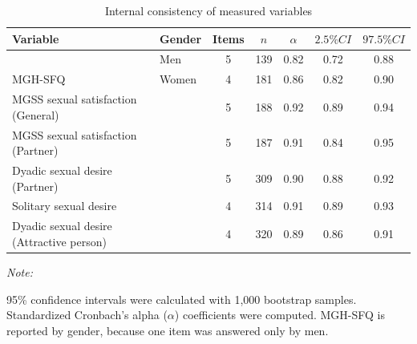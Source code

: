 \documentclass[
  bookmarksnumbered]{article}
\newenvironment{Shaded}{\begin{snugshade}}{\end{snugshade}}
\newcommand{\AttributeTok}[1]{\textcolor[rgb]{0.80,0.80,0.80}{#1}}
\newcommand{\ConstantTok}[1]{\textcolor[rgb]{0.86,0.64,0.64}{\textbf{#1}}}
\newcommand{\FunctionTok}[1]{\textcolor[rgb]{0.94,0.94,0.56}{#1}}
\newcommand{\NormalTok}[1]{\textcolor[rgb]{0.80,0.80,0.80}{#1}}
\newcommand{\SpecialCharTok}[1]{\textcolor[rgb]{0.86,0.64,0.64}{#1}}
\newcommand{\StringTok}[1]{\textcolor[rgb]{0.80,0.58,0.58}{#1}}
\begin{document}
\begin{Shaded}
\end{Shaded}

\begin{table}[H]
\centering
\caption{\label{tab:Cronbach-tab}Internal consistency of measured variables}
\centering
\begin{threeparttable}
\begin{tabular}[t]{llccccc}
\toprule
Variable & Gender & Items & $n$ & $\alpha$ & $2.5\% CI$ & $97.5\% CI$\\
\midrule
 & Men & 5 & 139 & 0.82 & 0.72 & 0.88\\
\cmidrule{2-7}
\multirow{-2}{*}{\raggedright\arraybackslash MGH-SFQ} & Women & 4 & 181 & 0.86 & 0.82 & 0.90\\
\cmidrule{1-7}
MGSS sexual satisfaction (General) &  & 5 & 188 & 0.92 & 0.89 & 0.94\\
\cmidrule{1-7}
MGSS sexual satisfaction (Partner) &  & 5 & 187 & 0.91 & 0.84 & 0.95\\
\cmidrule{1-7}
Dyadic sexual desire (Partner) &  & 5 & 309 & 0.90 & 0.88 & 0.92\\
\cmidrule{1-7}
Solitary sexual desire &  & 4 & 314 & 0.91 & 0.89 & 0.93\\
\cmidrule{1-7}
Dyadic sexual desire (Attractive person) &  & 4 & 320 & 0.89 & 0.86 & 0.91\\
\bottomrule
\end{tabular}
\begin{tablenotes}[para]
\item \textit{Note: } 
\item 95\% confidence intervals were calculated with 1,000 bootstrap samples.
           Standardized Cronbach's alpha ($\alpha$) coefficients were computed. 
           MGH-SFQ is reported by gender, because one item was answered only by men.
\end{tablenotes}
\end{threeparttable}
\end{table}
\end{document}
